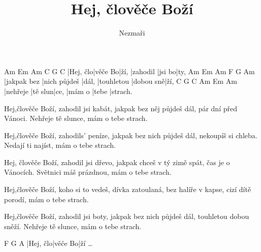 \documentclass{song}
\title{Hej, člověče Boží}
\author{Nezmaři}
\begin{document}
\strophe
Am       Em      Am   C        G      C
|Hej, člo|věče Bo|ží, |zahodil |jsi bo|ty,
Am          Em           Am    F          G         Am
|jakpak bez |nich půjdeš |dál, |touhletou |dobou sně|ží,
C        G       C    Am     Em    Am
|nehřeje |tě slun|ce, |mám o |tebe |strach.
\endstrophe

\strophe*
Hej,člověče Boží, zahodil jsi kabát,
jakpak bez něj půjdeš dál, pár dní před Vánoci.
Nehřeje tě slunce, mám o tebe strach.
\endstrophe

\strophe*
Hej,člověče Boží, zahodils' peníze,
jakpak bez nich půjdeš dál, nekoupíš si chleba.
Nedají ti najíst, mám o tebe strach.
\endstrophe

\strophe*
Hej, člověče Boží, zahodil jsi dřevo,
jakpak chceš v tý zimě spát, čas je o Vánocích.
Světnici máš prázdnou, mám o tebe strach.
\endstrophe

\strophe*
Hej,člověče Boží, koho si to vedeš,
dívka zatoulaná, bez halíře v kapse,
cizí dítě porodí, mám o tebe strach.
\endstrophe

\strophe*
Hej,člověče Boží, zahodil jsi boty,
jakpak bez nich půjdeš dál, touhletou dobou sněží.
Nehřeje tě slunce, mám o tebe strach.
\endstrophe

\strophe
F        G       A
|Hej, člo|věče Bo|ží \ldots
\endstrophe
\end{document}
